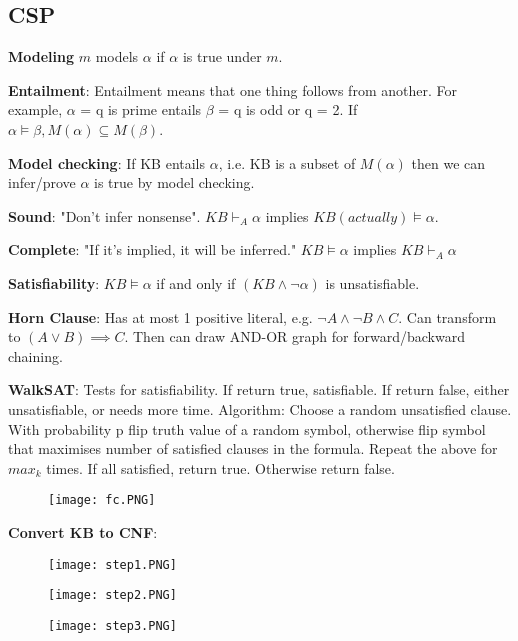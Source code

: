 \documentclass[a4paper,landscape]{article}
\newcommand{\rntopic}[1]{\vspace{-2.0em}\subsection*{#1}\vspace{-1.0em}}
\newcommand{\rnname}[1]{\textbf{#1}}
\begin{document}
\begin{multicols*}{4}
\begin{flatitemize}
\rntopic{CSP}
\item \rnname{Modeling} $m$ models $\alpha$ if $\alpha$ is true under $m$.
\item \rnname{Entailment}: Entailment means that one thing follows from another. For example, $\alpha$ = q is prime entails $\beta$ = q is odd or q = 2. If $\alpha \vDash \beta, M(\alpha) \subseteq M(\beta)$.  
\item \rnname{Model checking}: If KB entails $\alpha$, i.e. KB is a subset of $M(\alpha)$ then we can infer/prove $\alpha$ is true by model checking.
\item \rnname{Sound}: "Don't infer nonsense". $KB\vdash_A \alpha$ implies $KB (actually) \vDash \alpha$.
\item \rnname{Complete}: "If it's implied, it will be inferred." $KB \vDash \alpha$ implies $KB\vdash_A \alpha$

\item \rnname{Satisfiability}: $KB \vDash \alpha$ if and only if $(KB \wedge \neg \alpha)$ is unsatisfiable.
\item \rnname{Horn Clause}: Has at most 1 positive literal, e.g. $\neg A \wedge \neg B \wedge C$. Can transform to $(A \vee B) \implies C$. Then can draw AND-OR graph for forward/backward chaining.

\item \rnname{WalkSAT}: Tests for satisfiability. If return true, satisfiable. If return false, either unsatisfiable, or needs more time. Algorithm: Choose a random unsatisfied clause. With probability p flip truth value of a random symbol, otherwise flip symbol that maximises number of satisfied clauses in the formula. Repeat the above for $max_k$ times. If all satisfied, return true. Otherwise return false.

\vspace{-0.5cm}
    \begin{figure}[H]
      \texttt{[image: fc.PNG]}
    \end{figure}
\vspace{-0.4cm}

\item \rnname{Convert KB to CNF}:
\vspace{-0.5cm}
    \begin{figure}[H]
      \texttt{[image: step1.PNG]}
    \end{figure}
\vspace{-0.4cm}
\vspace{-0.5cm}
    \begin{figure}[H]
      \texttt{[image: step2.PNG]}
    \end{figure}
\vspace{-0.4cm}
\vspace{-0.5cm}
    \begin{figure}[H]
      \texttt{[image: step3.PNG]}
    \end{figure}
\vspace{-0.4cm}


\end{flatitemize}
\end{multicols*}
\end{document}
